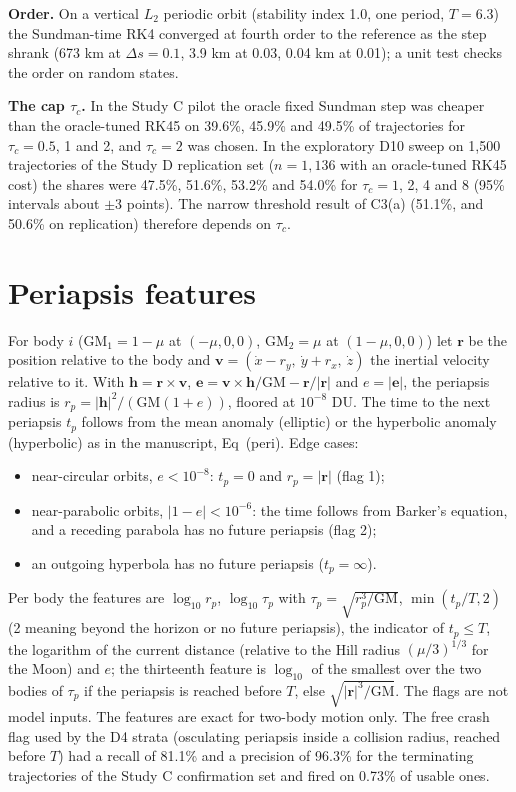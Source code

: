 \documentclass[10pt,letterpaper]{article}
\begin{document}
\textbf{Order.} On a vertical $L_2$ periodic orbit (stability index 1.0, one period, $T = 6.3$) the Sundman-time RK4 converged at fourth order to
the reference as the step shrank (673 km at $\Delta s = 0.1$, 3.9 km at 0.03, 0.04 km at 0.01); a unit test checks the order on random states.

\textbf{The cap $\tau_c$.} In the Study C pilot the oracle fixed Sundman step was cheaper than the oracle-tuned RK45 on 39.6\%, 45.9\% and 49.5\% of
trajectories for $\tau_c = 0.5$, 1 and 2, and $\tau_c = 2$ was chosen. In the exploratory D10 sweep on 1,500 trajectories of the Study D replication set
($n = 1{,}136$ with an oracle-tuned RK45 cost) the shares were 47.5\%, 51.6\%, 53.2\% and 54.0\% for $\tau_c = 1$, 2, 4 and 8 (95\% intervals about
$\pm3$ points). The narrow threshold result of C3(a) (51.1\%, and 50.6\% on replication) therefore depends on $\tau_c$.

\section{Periapsis features}
\label{sec:peri}
For body $i$ ($\mathrm{GM}_1 = 1-\mu$ at $(-\mu,0,0)$, $\mathrm{GM}_2 = \mu$ at $(1-\mu,0,0)$) let $\boldsymbol{r}$ be the position relative to the body and
$\boldsymbol{v} = (\dot x - r_y,\ \dot y + r_x,\ \dot z)$ the inertial velocity relative to it. With $\boldsymbol{h} = \boldsymbol{r}\times\boldsymbol{v}$,
$\boldsymbol{e} = \boldsymbol{v}\times\boldsymbol{h}/\mathrm{GM} - \boldsymbol{r}/|\boldsymbol{r}|$ and $e = |\boldsymbol{e}|$, the periapsis radius is
$r_p = |\boldsymbol{h}|^2/(\mathrm{GM}(1+e))$, floored at $10^{-8}$ DU. The time to the next periapsis $t_p$ follows from the mean anomaly (elliptic) or the
hyperbolic anomaly (hyperbolic) as in the manuscript, Eq~(peri). Edge cases:
\begin{itemize}
\item near-circular orbits, $e < 10^{-8}$: $t_p = 0$ and $r_p = |\boldsymbol{r}|$ (flag 1);
\item near-parabolic orbits, $|1-e| < 10^{-6}$: the time follows from Barker's equation, and a receding parabola has no future periapsis (flag 2);
\item an outgoing hyperbola has no future periapsis ($t_p = \infty$).
\end{itemize}
Per body the features are $\log_{10} r_p$, $\log_{10}\tau_p$ with $\tau_p = \sqrt{r_p^3/\mathrm{GM}}$, $\min(t_p/T, 2)$ (2 meaning beyond the horizon or
no future periapsis), the indicator of $t_p \le T$, the logarithm of the current distance (relative to the Hill radius $(\mu/3)^{1/3}$ for the Moon) and
$e$; the thirteenth feature is $\log_{10}$ of the smallest over the two bodies of $\tau_p$ if the periapsis is reached before $T$, else
$\sqrt{|\boldsymbol{r}|^3/\mathrm{GM}}$. The flags are not model inputs. The features are exact for two-body motion only. The free crash flag
used by the D4 strata (osculating periapsis inside a collision radius, reached before $T$) had a recall of 81.1\% and a precision of 96.3\% for the
terminating trajectories of the Study C confirmation set and fired on 0.73\% of usable ones.
\end{document}
